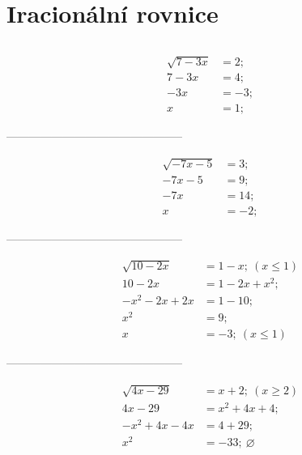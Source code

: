 \documentclass[a4paper,12pt]{article}
\begin{document}
\section{Iracionální rovnice}

\subsection{} %

\begin{align*} %
\sqrt{7 - 3x} &= 2; \\
7 - 3x &= 4; \\
-3x &= -3; \\
x &= 1;
\end{align*}

\begin{center}
-----------------------------------------------
\end{center}

\begin{align*} %
\sqrt{-7x - 5} &= 3; \\
-7x - 5 &= 9; \\
-7x &= 14; \\
x &= -2;
\end{align*}

\begin{center}
-----------------------------------------------
\end{center}

\begin{align*} %
\sqrt{10 - 2x} &= 1 - x; ~(x \leq 1) \\
10 - 2x &= 1 - 2x + x^2; \\
-x^2 - 2x + 2x &= 1 - 10; \\
x^2 &= 9; \\
x &= -3; ~(x \leq 1)
\end{align*}

\begin{center}
-----------------------------------------------
\end{center}

\begin{align*} %
\sqrt{4x - 29} &= x + 2; ~(x \geq 2) \\
4x - 29 &= x^2 + 4x + 4; \\
-x^2 + 4x - 4x &= 4 + 29; \\
x^2 &= -33; ~\varnothing
\end{align*}
\end{document}
